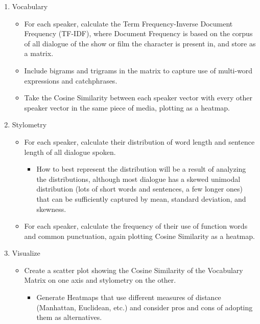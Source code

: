 \documentclass{article}
\begin{document}
\begin{titlepage}
\begin{itemize}
\begin{enumerate}
			\item Vocabulary
			\begin{itemize}
				\item For each speaker, calculate the Term Frequency-Inverse Document Frequency (TF-IDF), where Document Frequency is based on the corpus of all dialogue of the show or film the character is present in, and store as a matrix.
				\item Include bigrams and trigrams in the matrix to capture use of multi-word expressions and catchphrases.
				\item Take the Cosine Similarity between each speaker vector with every other speaker vector in the same piece of media, plotting as a heatmap.
			\end{itemize}
		
			\item Stylometry
			\begin{itemize}
				\item For each speaker, calculate their distribution of word length and sentence length of all dialogue spoken.
				\begin{itemize}
					\item How to best represent the distribution will be a result of analyzing the distributions, although most dialogue has a skewed unimodal distribution (lots of short words and sentences, a few longer ones) that can be sufficiently captured by mean, standard deviation, and skewness.
				\end{itemize}
				\item For each speaker, calculate the frequency of their use of function words and common punctuation, again plotting Cosine Similarity as a heatmap.
			\end{itemize}
		
			\item Visualize
			\begin{itemize}
				\item Create a scatter plot showing the Cosine Similarity of the Vocabulary Matrix on one axis and stylometry on the other.
				\begin{itemize}
					\item Generate Heatmaps that use different measures of distance (Manhattan, Euclidean, etc.) and consider pros and cons of adopting them as alternatives.
				\end{itemize}
			\end{itemize}
		\end{enumerate}
	

\end{itemize}
\end{titlepage}
\end{document}
